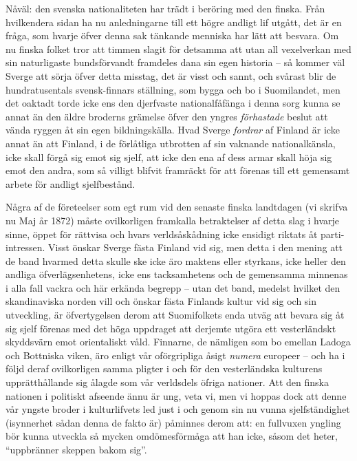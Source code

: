Nåväl: den svenska nationaliteten har trädt i beröring med den finska.
Från hvilkendera sidan ha nu anledningarne till ett högre andligt lif
utgått, det är en fråga, som hvarje öfver denna sak tänkande menniska
har lätt att besvara. Om nu finska folket tror att timmen slagit för
detsamma att utan all vexelverkan med sin naturligaste bundsförvandt
framdeles dana sin egen historia -- så kommer väl Sverge att sörja öfver
detta misstag, det är visst och sannt, och svårast blir de
hundratusentals svensk-finnars ställning, som bygga och bo i
Suomilandet, men det oaktadt torde icke ens den djerfvaste
nationalfåfänga i denna sorg kunna se annat än den äldre broderns
grämelse öfver den yngres \emph{förhastade} beslut att vända ryggen åt
sin egen bildningskälla. Hvad Sverge \emph{fordrar} af Finland är icke
annat än att Finland, i de förlåtliga utbrotten af sin vaknande
nationalkänsla, icke skall förgå sig emot sig sjelf, att icke den ena af
dess armar skall höja sig emot den andra, som så villigt blifvit
framräckt för att förenas till ett gemensamt arbete för andligt
sjelfbestånd.

Några af de företeelser som egt rum vid den senaste finska landtdagen
(vi skrifva nu Maj år 1872) måste ovilkorligen framkalla betraktelser af
detta slag i hvarje sinne, öppet för rättvisa och hvars verldsåskådning
icke ensidigt riktats åt parti-intressen. Visst önskar Sverge fästa
Finland vid sig, men detta i den mening att de band hvarmed detta skulle
ske icke äro maktens eller styrkans, icke heller den andliga
öfverlägsenhetens, icke ens tacksamhetens och de gemensamma minnenas i
alla fall vackra och här erkända begrepp -- utan det band, medelst
hvilket den skandinaviska norden vill och önskar fästa Finlands kultur
vid sig och sin utveckling, är öfvertygelsen derom att Suomifolkets enda
utväg att bevara sig åt sig sjelf förenas med det höga uppdraget att
derjemte utgöra ett vesterländskt skyddsvärn emot orientaliskt våld.
Finnarne, de nämligen som bo emellan Ladoga och Bottniska viken, äro
enligt vår oförgripliga åsigt \emph{numera} europeer -- och ha i följd
deraf ovilkorligen samma pligter i och för den vesterländska kulturens
upprätthållande sig ålagde som vår verldsdels öfriga nationer. Att den
finska nationen i politiskt afseende ännu är ung, veta vi, men vi hoppas
dock att denne vår yngste broder i kulturlifvets led just i och genom
sin nu vunna sjelfständighet (isynnerhet sådan denna de fakto är)
påminnes derom att: en fullvuxen yngling bör kunna utveckla så mycken
omdömesförmåga att han icke, såsom det heter, ``uppbränner skeppen bakom
sig''.

